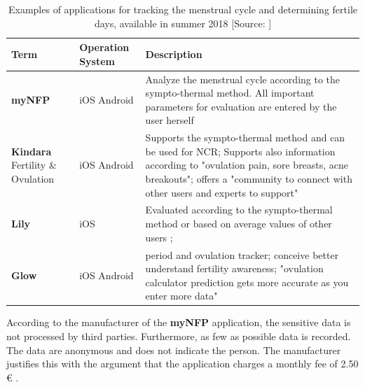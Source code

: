 \begin{table}[t]
  \caption{Examples of applications for tracking the menstrual cycle and determining fertile days, available in summer 2018 [Source: ]}
  \label{tab:typ_of_app_for_tracking_cycle}
  \scriptsize
  \begin{center}
    \begin{tabular}{|p{2cm}|p{3cm}|p{12cm}|}
		\hline
		Term & Operation System  & Description \\
		\hline
		\hline
		
		\textbf{myNFP} &  iOS \newline Android &  Analyze the menstrual cycle according to the sympto-thermal method. All important parameters for evaluation are entered by the user herself \cite{myNFP}
		\\
		\hline
		\textbf{Kindara} Fertility \& Ovulation  & iOS \newline Android & Supports the sympto-thermal method and can be used for \acs{NCR}; Supports also information according to "ovulation pain, sore breasts, acne breakouts"; offers a "community to connect with other users and experts to support" \cite{kindara}\\
		\hline
		\textbf{Lily} & iOS & Evaluated according to the sympto-thermal method or based on average values of other users \cite{lily};
		 \\
		\hline
		\textbf{Glow} & iOS \newline Android & period and ovulation tracker; conceive better understand fertility awareness; "ovulation calculator prediction gets more accurate as you enter more data" \cite{glow}\\
		\hline
	\end{tabular}
  \end{center}
\end{table}
According to the manufacturer of the \textbf{myNFP} application, the sensitive data is not processed by third parties. Furthermore, as few as possible data is recorded. The data are anonymous and does not indicate the person. The manufacturer justifies this with the argument that the application charges a monthly fee of 2.50 \euro{} \cite{myNFP}.

